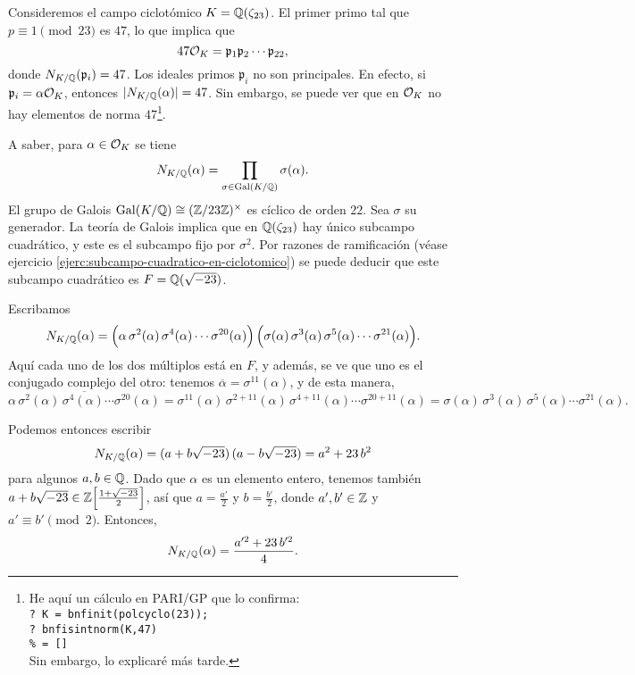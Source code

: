 \begin{ejemplo}[Kummer]
  Consideremos el campo ciclotómico $K = \mathbb{Q} (\zeta_{23})$. El primer primo
  tal que $p\equiv 1\pmod{23}$ es $47$, lo que implica que
  $$47 \mathcal{O}_K = \mathfrak{p}_1 \mathfrak{p}_2 \cdots \mathfrak{p}_{22},$$
  donde $N_{K/\mathbb{Q}} (\mathfrak{p}_i) = 47$. Los ideales primos $\mathfrak{p}_i$
  no son principales. En efecto, si $\mathfrak{p}_i = \alpha \mathcal{O}_K$, entonces
  $|N_{K/\mathbb{Q}} (\alpha)| = 47$. Sin embargo, se puede ver que en $\mathcal{O}_K$ no hay
  elementos de norma $47$\footnote{
    He aquí un cálculo en PARI/GP que lo confirma:\\
\texttt{? K = bnfinit(polcyclo(23));\\
? bnfisintnorm(K,47)\\
\% = []}\\
Sin embargo, lo explicaré más tarde.}.

  A saber, para $\alpha \in \mathcal{O}_K$ se tiene
  $$N_{K/\mathbb{Q}} (\alpha) = \prod_{\sigma \in \operatorname{Gal} (K/\mathbb{Q})} \sigma (\alpha).$$
  El grupo de Galois $\operatorname{Gal} (K/\mathbb{Q}) \cong (\mathbb{Z}/23\mathbb{Z})^\times$ es cíclico de orden
  $22$. Sea $\sigma$ su generador. La teoría de Galois implica que en
  $\mathbb{Q} (\zeta_{23})$ hay único subcampo cuadrático, y este es el subcampo fijo
  por $\sigma^2$.  Por razones de ramificación (véase ejercicio
  \ref{ejerc:subcampo-cuadratico-en-ciclotomico}) se puede deducir que este
  subcampo cuadrático es $F = \mathbb{Q} (\sqrt{-23})$.

  Escribamos
  \[ N_{K/\mathbb{Q}} (\alpha) =
     \Bigl(\alpha\,\sigma^2(\alpha)\,\sigma^4(\alpha)\cdots\sigma^{20}(\alpha)\Bigr) \,
     \Bigl(\sigma(\alpha)\,\sigma^3(\alpha)\,\sigma^5(\alpha)\cdots\sigma^{21}(\alpha)\Bigr). \]
  Aquí cada uno de los dos múltiplos está en $F$, y además, se ve que uno es
  el conjugado complejo del otro: tenemos $\overline{\alpha} = \sigma^{11} (\alpha)$,
  y de esta manera,
  \[ \overline{\alpha\,\sigma^2(\alpha)\,\sigma^4(\alpha)\cdots\sigma^{20}(\alpha)} =
     \sigma^{11} (\alpha)\,\sigma^{2+11}(\alpha)\,\sigma^{4+11}(\alpha)\cdots\sigma^{20+11}(\alpha) =
     \sigma(\alpha)\,\sigma^3(\alpha)\,\sigma^5(\alpha)\cdots\sigma^{21}(\alpha). \]

  Podemos entonces escribir
  $$N_{K/\mathbb{Q}} (\alpha) = (a + b\sqrt{-23})\,(a - b\sqrt{-23}) = a^2 + 23\,b^2$$
  para algunos $a,b \in \mathbb{Q}$. Dado que $\alpha$ es un elemento entero, tenemos
  también $a + b\sqrt{-23} \in \mathbb{Z} \Bigl[\frac{1+\sqrt{-23}}{2}\Bigr]$, así que
  $a = \frac{a'}{2}$ y $b = \frac{b'}{2}$, donde $a',b' \in \mathbb{Z}$ y $a' \equiv b'
  \pmod{2}$. Entonces,
  $$N_{K/\mathbb{Q}} (\alpha) = \frac{a'^2 + 23\,b'^2}{4}.$$


\end{ejemplo}
